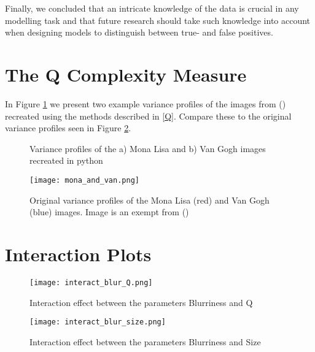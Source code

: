 \documentclass[12pt]{article}
\begin{document}
Finally, we concluded that an intricate knowledge of the data is crucial in any modelling task and that future research should take such knowledge into account when designing models to distinguish between true- and false positives.


\clearpage
\appto{\bibsetup}{\raggedright}
\printbibliography
\clearpage

\appendix
\section{The Q Complexity Measure}\label{AQ}
In Figure \ref{fig:Qrecreated} we present two example variance profiles of the images from (\cite{zanetteQuantifyingComplexityBlackandwhite2018}) recreated using the methods described in \ref{Q}. Compare these to the original variance profiles seen in Figure \ref{fig:monalisa}.

\begin{figure}[h]
	\centering
	\hfill
	\caption{Variance profiles of the a) Mona Lisa and b) Van Gogh images recreated in python} 
	\label{fig:Qrecreated}
\end{figure}

\begin{figure}[h]
	\begin{center}
		\texttt{[image: mona\_and\_van.png]}
	\end{center}
	\caption{Original variance profiles of the Mona Lisa (red) and Van Gogh (blue) images. Image is an exempt from (\cite{zanetteQuantifyingComplexityBlackandwhite2018})}
	\label{fig:monalisa}
\end{figure}

\clearpage
\section{Interaction Plots}\label{Ainteraction}

\begin{figure}[h]
	\begin{center}
		\texttt{[image: interact\_blur\_Q.png]}
	\end{center}
	\caption{Interaction effect between the parameters Blurriness and Q}
	\label{fig:interact_blur_Q}
\end{figure}

\begin{figure}[h]
	\begin{center}
		\texttt{[image: interact\_blur\_size.png]}
	\end{center}
	\caption{Interaction effect between the parameters Blurriness and Size}
	\label{fig:interact_blur_size}
\end{figure}
\end{document}
